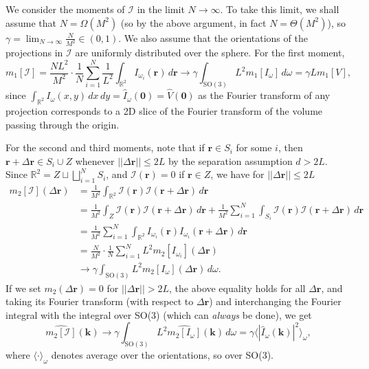 \documentclass{amsart}
\theoremstyle{definition}
\theoremstyle{remark}
\numberwithin{equation}{section}
\newcommand{\rr}{\mathbf{r}}
\newcommand{\kk}{\mathbf{k}}
\newcommand{\RR}{\mathbb{R}}
\newcommand{\II}{\mathcal{I}}
\begin{document}
We consider the moments of $\II$ in the limit $N\to\infty$. To take this limit, we shall assume that $N=\Omega(M^2)$ (so by the above argument, in fact $N=\Theta(M^2)$), so $\gamma = \lim_{N\to\infty}\frac{N}{M^2}\in(0,1)$. We also assume that the orientations of the projections in $\II$ are uniformly distributed over the sphere. For the first moment,
\[ m_1[\II] =
  \frac{NL^2}{M^2}\cdot\frac{1}{N}\sum_{i=1}^N\frac{1}{L^2}\int_{\RR^2}I_{\omega_i}(\rr)\,
  d\rr \to \gamma\int_{\text{SO}(3)} L^2m_1[I_{\omega}]\, d\omega =
  \gamma L m_1[V],\]
since $\int_{\RR^2} I_{\omega}(x,y)\, dx\, dy = \widehat I_{\omega}(\mathbf{0})=\widehat V(\mathbf{0})$ as the Fourier transform of any projection corresponds to a 2D slice of the Fourier transform of the volume passing through the origin.

For the second and third moments, note that if $\rr\in S_i$ for some $i$, then $\rr+\Delta\rr\in S_i\cup Z$ whenever $||\Delta\rr||\leq 2L$ by the separation assumption $d> 2L$. Since $\RR^2=Z\sqcup\bigsqcup_{i=1}^NS_i$, and $\II(\rr)=0$ if $\rr\in Z$, we have for $||\Delta\rr||\leq 2L$
\[\begin{aligned} m_2[\II](\Delta \rr)  &= \frac{1}{M^2}\int_{\RR^2}\II(\rr)\II(\rr+\Delta\rr)\, d\rr\\ 
&= \frac{1}{M^2}\int_Z\II(\rr)\II(\rr+\Delta\rr)\, d\rr + \frac{1}{M^2}\sum_{i=1}^N\int_{S_i}\II(\rr)\II(\rr+\Delta\rr)\, d\rr\\ 
&= \frac{1}{M^2}\sum_{i=1}^N\int_{\RR^2}I_{\omega_i}(\rr)I_{\omega_i}(\rr+\Delta\rr)\, d\rr\\ 
&= \frac{N}{M^2}\cdot\frac{1}{N}\sum_{i=1}^NL^2m_2[I_{\omega_i}](\Delta\rr)\\
&\to \gamma\int_{\text{SO}(3)}L^2m_2[I_{\omega}](\Delta\rr)\, d\omega.\end{aligned}\]
If we set $m_2(\Delta \rr) = 0$ for $||\Delta\rr||>2L$, the above equality holds for all $\Delta\rr$, and taking its Fourier transform (with respect to $\Delta\rr$) and interchanging the Fourier integral with the integral over SO(3) (which can \emph{always} be done), we get
\[ \widehat{m_2[\II]}(\kk) \to \gamma\int_{\text{SO}(3)}L^2\widehat{m_2[I_{\omega}]}(\kk)\, d\omega = \gamma\langle|\widehat I_{\omega}(\kk)|^2\rangle_{\omega},\]
where $\langle\cdot\rangle_{\omega}$ denotes average over the orientations, so over SO(3).
\end{document}

